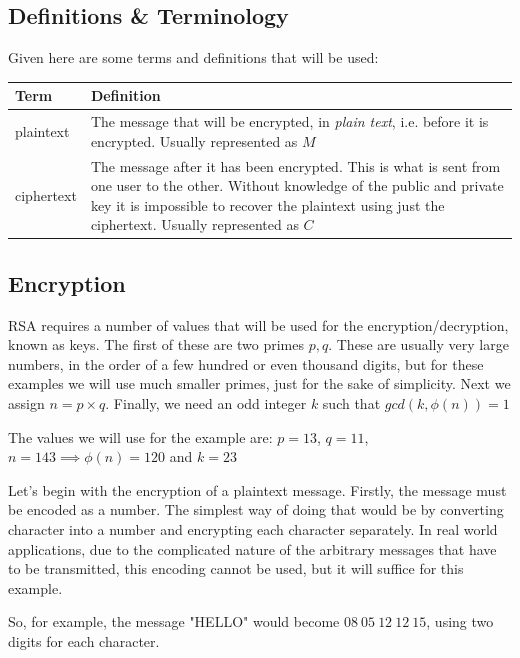 \documentclass[12pt]{article}
\begin{document}
    \subsection{Definitions \& Terminology}
    Given here are some terms and definitions that will be used:
    \begin{table}[H]
        \begin{tabular}{ | m{5em} | p{30em} | }
            \hline
            Term      & Definition\\
            \hline
            plaintext & The message that will be encrypted, in \emph{plain text}, i.e. before it is
                        encrypted. Usually represented as $M$\\
            \hline
            ciphertext & The message after it has been encrypted. This is what is sent from one
                         user to the other. Without knowledge of the public and private key it 
                         is impossible to recover the plaintext using just the ciphertext. Usually
                         represented as $C$\\
            \hline
        \end{tabular}
    \end{table}
    \subsection{Encryption}
    RSA requires a number of values that will be used for the encryption/decryption, known as keys.
    The first of these are two primes $p,q$. These are usually very large numbers, in the order
    of a few hundred or even thousand digits, but for these examples we will use much smaller primes,
    just for the sake of simplicity. Next we assign $n=p \times q$. Finally, we need an odd 
    integer $k$ such that $gcd(k, \phi (n)) = 1$ 

    The values we will use for the example are: $p=13$, $q=11$, $n=143 \implies \phi (n) = 120$
    and $k = 23$

    Let's begin with the encryption of a plaintext message. Firstly, the message must be encoded
    as a number. The simplest way of doing that would be by converting character into a number 
    and encrypting each character separately. In real world applications, due to the complicated nature of the 
    arbitrary messages that have to be transmitted, this encoding cannot be used, but it will suffice for this 
    example.

    So, for example, the message "HELLO" would become $08\ 05\ 12\ 12\ 15$, using two digits for 
    each character.
\end{document}
